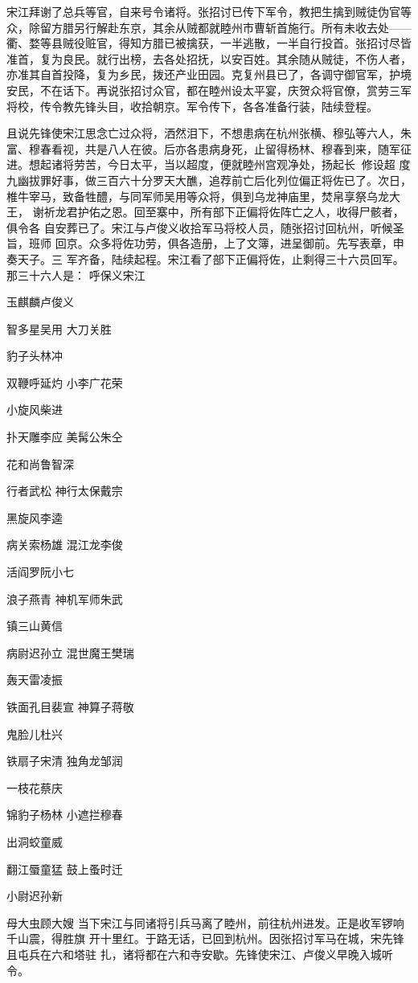 宋江拜谢了总兵等官，自来号令诸将。张招讨已传下军令，教把生擒到贼徒伪官等
众，除留方腊另行解赴东京，其余从贼都就睦州市曹斩首施行。所有未收去处——
衢、婺等县贼役赃官，得知方腊已被擒获，一半逃散，一半自行投首。张招讨尽皆
准首，复为良民。就行出榜，去各处招抚，以安百姓。其余随从贼徒，不伤人者，
亦准其自首投降，复为乡民，拨还产业田园。克复州县已了，各调守御官军，护境
安民，不在话下。再说张招讨众官，都在睦州设太平宴，庆贺众将官僚，赏劳三军
将校，传令教先锋头目，收拾朝京。军令传下，各各准备行装，陆续登程。

且说先锋使宋江思念亡过众将，洒然泪下，不想患病在杭州张横、穆弘等六人，朱
富、穆春看视，共是八人在彼。后亦各患病身死，止留得杨林、穆春到来，随军征
进。想起诸将劳苦，今日太平，当以超度，便就睦州宫观净处，扬起长，修设超
度九幽拔罪好事，做三百六十分罗天大醮，追荐前亡后化列位偏正将佐已了。次日，
椎牛宰马，致备牲醴，与同军师吴用等众将，俱到乌龙神庙里，焚帛享祭乌龙大王，
谢祈龙君护佑之恩。回至寨中，所有部下正偏将佐阵亡之人，收得尸骸者，俱令各
自安葬已了。宋江与卢俊义收拾军马将校人员，随张招讨回杭州，听候圣旨，班师
回京。众多将佐功劳，俱各造册，上了文簿，进呈御前。先写表章，申奏天子。三
军齐备，陆续起程。宋江看了部下正偏将佐，止剩得三十六员回军。那三十六人是：
呼保义宋江

玉麒麟卢俊义

智多星吴用
大刀关胜

豹子头林冲

双鞭呼延灼
小李广花荣

小旋风柴进

扑天雕李应
美髯公朱仝

花和尚鲁智深

行者武松
神行太保戴宗

黑旋风李逵

病关索杨雄
混江龙李俊

活阎罗阮小七

浪子燕青
神机军师朱武

镇三山黄信

病尉迟孙立
混世魔王樊瑞

轰天雷凌振

铁面孔目裴宣
神算子蒋敬

鬼脸儿杜兴

铁扇子宋清
独角龙邹润

一枝花蔡庆

锦豹子杨林
小遮拦穆春

出洞蛟童威

翻江蜃童猛
鼓上蚤时迁

小尉迟孙新

母大虫顾大嫂
当下宋江与同诸将引兵马离了睦州，前往杭州进发。正是收军锣响千山震，得胜旗
开十里红。于路无话，已回到杭州。因张招讨军马在城，宋先锋且屯兵在六和塔驻
扎，诸将都在六和寺安歇。先锋使宋江、卢俊义早晚入城听令。

